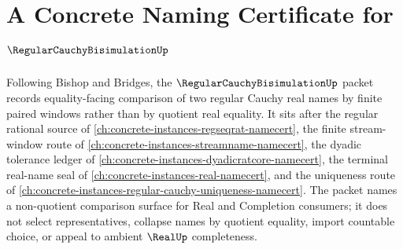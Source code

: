 \chapter{A Concrete Naming Certificate for $\RegularCauchyBisimulationUp$}
\label{ch:concrete-instances-regular-cauchy-bisimulation-namecert}

Following Bishop and Bridges, the $\RegularCauchyBisimulationUp$ packet records equality-facing comparison of two regular Cauchy real names by finite paired windows rather than by quotient real equality. It sits after the regular rational source of \autoref{ch:concrete-instances-regseqrat-namecert}, the finite stream-window route of \autoref{ch:concrete-instances-streamname-namecert}, the dyadic tolerance ledger of \autoref{ch:concrete-instances-dyadicratcore-namecert}, the terminal real-name seal of \autoref{ch:concrete-instances-real-namecert}, and the uniqueness route of \autoref{ch:concrete-instances-regular-cauchy-uniqueness-namecert}. The packet names a non-quotient comparison surface for Real and Completion consumers; it does not select representatives, collapse names by quotient equality, import countable choice, or appeal to ambient $\RealUp$ completeness.

